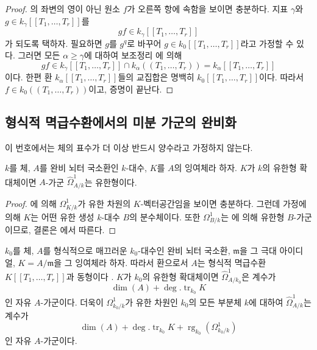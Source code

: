 \begin{proof}
의 좌변의 영이 아닌 원소 $f$가 오른쪽 항에
속함을 보이면 충분하다. 지표 $\gamma$와
$g\in k_\gamma[[T_1,\ldots,T_r]]$를
\[
gf\in k_\gamma[[T_1,\ldots,T_r]]
\]
가 되도록 택하자. 필요하면 $g$를 $g^q$로 바꾸어
$g\in k_0[[T_1,\ldots,T_r]]$라고 가정할 수 있다. 그러면 모든
$\alpha\geqslant\gamma$에 대하여 보조정리
에 의해
\[
gf\in k_\gamma[[T_1,\ldots,T_r]]
\cap k_\alpha((T_1,\ldots,T_r))
=k_\alpha[[T_1,\ldots,T_r]]
\]
이다. 한편 환 $k_\alpha[[T_1,\ldots,T_r]]$들의 교집합은 명백히
$k_0[[T_1,\ldots,T_r]]$이다. 따라서
$f\in k_0((T_1,\ldots,T_r))$이고, 증명이 끝난다.
\end{proof}

\subsection{형식적 멱급수환에서의 미분 가군의 완비화}
\label{subsection:0.21.9-ko}

이 번호에서는 체의 표수가 더 이상 반드시 양수라고 가정하지 않는다.

\begin{lemma}[21.9.1]
\label{0.21.9.1-ko}
$k$를 체, $A$를 완비 뇌터 국소환인 $k$-대수, $K$를 $A$의
잉여체라 하자. $K$가 $k$의 유한형 확대체이면 $A$-가군
$\widehat{\Omega}^1_{A/k}$는 유한형이다.
\end{lemma}

\begin{proof}
에 의해 $\Omega^1_{K/k}$가 유한 차원의
$K$-벡터공간임을 보이면 충분하다. 그런데 가정에 의해 $K$는 어떤
유한 생성 $k$-대수 $B$의 분수체이다. 또한
$\Omega^1_{B/k}$는 에 의해 유한형 $B$-가군이므로,
결론은 에서 따른다.
\end{proof}

\begin{proposition}[21.9.2]
\label{0.21.9.2-ko}
$k_0$를 체, $A$를 형식적으로 매끄러운 $k_0$-대수인 완비 뇌터
국소환, $\mathfrak m$을 그 극대 아이디얼,
$K=A/\mathfrak m$을 그 잉여체라 하자. 따라서 환으로서 $A$는
형식적 멱급수환 $K[[T_1,\ldots,T_r]]$과 동형이다
. $K$가 $k_0$의 유한형 확대체이면
$\widehat{\Omega}^1_{A/k_0}$은 계수가
\[
\dim(A)+\deg.\operatorname{tr}_{k_0}K
\]
인 자유 $A$-가군이다. 더욱이 $\Omega^1_{k_0/k}$가 유한 차원인
$k_0$의 모든 부분체 $k$에 대하여 $\widehat{\Omega}^1_{A/k}$는
계수가
\[
\dim(A)+\deg.\operatorname{tr}_{k_0}K
+\operatorname{rg}_{k_0}(\Omega^1_{k_0/k})
\]
인 자유 $A$-가군이다.
\end{proposition}

